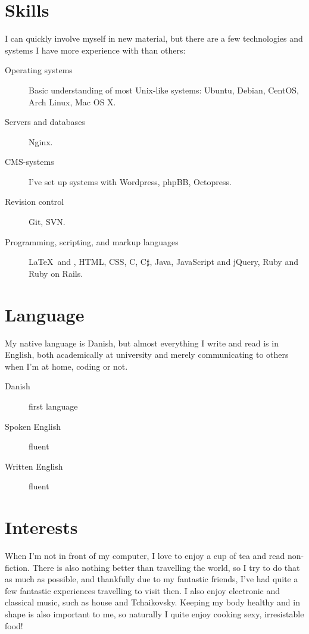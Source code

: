 \documentclass[margin,line,a4paper]{resume}
\begin{document}
\begin{resume}
\section{\mysidestyle Skills} \vspace{1mm}
I can quickly involve myself in new material, but there are a few
technologies and systems I have more experience with than others:
\vspace{0.5cm}
\begin{description}
  \item[Operating systems] Basic understanding of most Unix-like
    systems: Ubuntu, Debian, CentOS, Arch Linux, Mac OS X.
  \item[Servers and databases] Nginx. 
  \item[CMS-systems] I've set up systems with Wordpress, phpBB,
    Octopress.
  \item[Revision control] Git, SVN.
  \item[Programming, scripting, and markup languages] \LaTeX\ and
    \XeTeX, HTML, CSS, C, C$\sharp$, Java, JavaScript and jQuery, Ruby
    and Ruby on Rails.
\end{description}

\pagebreak
\section{\mysidestyle Language}
My native language is Danish, but almost everything I write and read is
in English, both academically at university and merely communicating to
others when I'm at home, coding or not.

\begin{description}
  \item[Danish] first language
  \item[Spoken English] fluent
  \item[Written English] fluent 
\end{description}

\section{\mysidestyle Interests}
When I'm not in front of my computer, I love to enjoy a cup of tea and read non-fiction. There is also nothing better than travelling the world, so I try to do that as much as possible, and thankfully due to my fantastic friends, I've had quite a few fantastic experiences travelling to visit then. I also enjoy electronic and classical music, such as house and Tchaikovsky. Keeping my body healthy and in shape is also important to me, so naturally I quite enjoy cooking sexy, irresistable food!
\end{resume}
\end{document}
